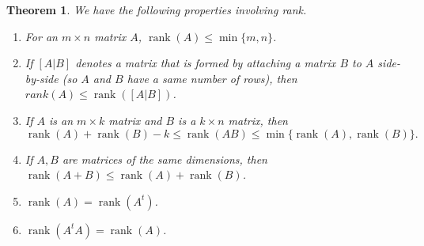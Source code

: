 \documentclass[12pt,letterpaper]{book}
\numberwithin{equation}{section}
\newtheorem{thm}{\textbf{Theorem}}[section]
\theoremstyle{definition}
\newcommand{\rank}{\operatorname{rank}}
\begin{document}
\begin{thm}\label{rank properties}
We have the following properties involving rank.
\begin{enumerate}
\item For an $m\times n$ matrix $A$, $\rank(A)\leq \min\{m,n\}$.
\item If $[A|B]$ denotes a matrix that is formed by attaching a matrix $B$ to $A$ side-by-side (so $A$ and $B$ have a same number of rows), then $rank(A)\leq \rank([A|B])$.
\item If $A$ is an $m\times k$ matrix and $B$ is a $k\times n$ matrix, then
$$\rank(A)+\rank(B)-k\leq \rank(AB)\leq \min\{\rank(A),\rank(B)\}.$$
\item If $A,B$ are matrices of the same dimensions, then $\rank(A+B)\leq \rank(A)+\rank(B)$.
\item $\rank (A)=\rank(A^t)$.
\item $\rank(A^tA)=\rank(A)$.
\end{enumerate}
\end{thm}
\end{document}
